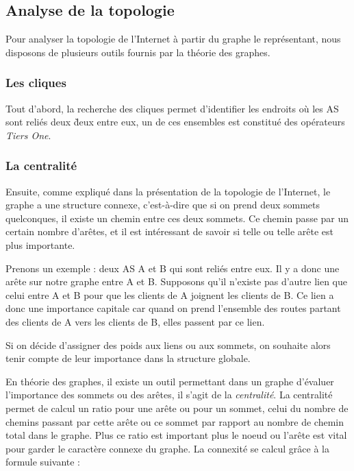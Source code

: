 

%

\subsection{Analyse de la topologie}

\par
Pour analyser la topologie de l'Internet \`a partir du graphe le repr\'esentant, nous disposons de plusieurs outils fournis par la th\'eorie des graphes.

\subsubsection{Les cliques}

Tout d'abord, la recherche des cliques permet d'identifier les endroits o\`u les AS sont reli\'es deux \` deux entre eux, un de ces ensembles est constitu\'e des op\'erateurs \textit{Tiers One}.

\subsubsection{La centralit\'e}

\par
Ensuite, comme expliqu\'e dans la pr\'esentation de la topologie de l'Internet, le graphe a une structure connexe, c'est-\`a-dire que si on prend deux sommets quelconques, il existe un chemin entre ces deux sommets.
Ce chemin passe par un certain nombre d'ar\^etes, et il est int\'eressant de savoir si telle ou telle ar\^ete est plus importante.
\par
Prenons un exemple : deux AS A et B qui sont reli\'es entre eux. Il y a donc une ar\^ete sur notre graphe entre A et B. Supposons qu'il n'existe pas d'autre lien que celui entre A et B pour que les clients de A joignent les clients de B. Ce lien a donc une importance capitale car quand on prend l'ensemble des routes partant des clients de A vers les clients de B, elles passent par ce lien.
\par
Si on d\'ecide d'assigner des poids aux liens ou aux sommets, on souhaite alors tenir compte de leur importance dans la structure globale.\\

\par
En th\'eorie des graphes, il existe un outil permettant dans un graphe d'\'evaluer l'importance des sommets ou des ar\^etes, il s'agit de la \textit{centralit\'e}. La centralit\'e permet de calcul un ratio pour une ar\^ete ou pour un sommet, celui du nombre de chemins passant par cette ar\^ete ou ce sommet par rapport au nombre de chemin total dans le graphe. Plus ce ratio est important plus le noeud ou l'ar\^ete est vital pour garder le caract\`ere connexe du graphe. La connexit\'e se calcul gr\^ace \`a la formule suivante :




%
